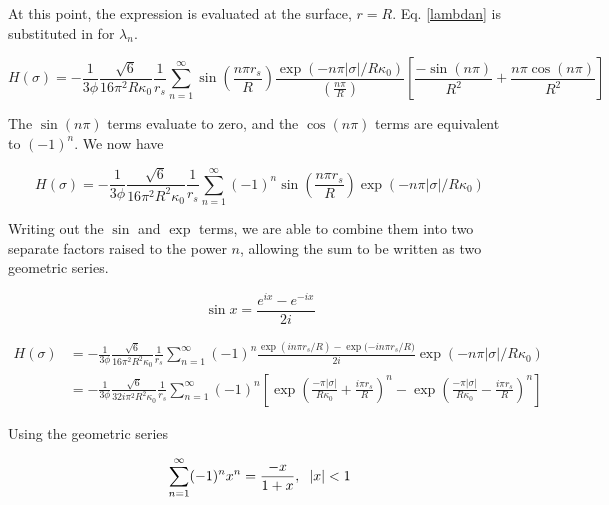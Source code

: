\documentclass[onecolumn]{aastex63}
\begin{document}
At this point, the expression is evaluated at the surface, $r=R$. Eq. \ref{lambdan} is substituted in for $\lambda_n$.

\begin{equation}
    H(\sigma) = - \frac{1}{3 \phi} \frac{\sqrt{6}}{16 \pi^2 R \kappa_0} \frac{1}{r_s} \sum_{n=1}^{\infty} \sin{\left(\frac{n\pi r_s}{R}\right)} \frac{\exp{(-n \pi |\sigma|/R\kappa_0)}}{\left(\frac{n\pi}{R}\right)} \left[ \frac{-\sin(n \pi)}{R^2} + \frac{n \pi \cos(n \pi)}{R^2}\right]
\end{equation}

The $\sin(n\pi)$ terms evaluate to zero, and the $\cos(n\pi)$ terms are equivalent to $(-1)^n$. We now have

\begin{equation}
    H(\sigma) = - \frac{1}{3 \phi} \frac{\sqrt{6}}{16 \pi^2 R^2 \kappa_0} \frac{1}{r_s} \sum_{n=1}^{\infty} (-1)^n \sin{\left(\frac{n\pi r_s}{R}\right)} \exp{(-n \pi |\sigma|/R\kappa_0)}
\end{equation}

Writing out the $\sin$ and $\exp$ terms, we are able to combine them into two separate factors raised to the power $n$, allowing the sum to be written as two geometric series.

\begin{equation}
    \sin{x} = \frac{e^{ix}-e^{-ix}}{2i}
\end{equation}

\begin{equation}
    \begin{split}
        H(\sigma) &= - \frac{1}{3 \phi} \frac{\sqrt{6}}{16 \pi^2 R^2 \kappa_0} \frac{1}{r_s} \sum_{n=1}^{\infty} (-1)^n \frac{\exp{(in\pi r_s / R)}-\exp{(-in\pi r_s/R})}{2i} \exp{(-n \pi |\sigma|/R\kappa_0)} \\
        &= - \frac{1}{3 \phi} \frac{\sqrt{6}}{32 i \pi^2 R^2 \kappa_0} \frac{1}{r_s} \sum_{n=1}^{\infty} (-1)^n \left[ \exp{\left(\frac{-\pi |\sigma|}{R\kappa_0} + \frac{i\pi r_s}{R}\right)^n}-\exp{\left(\frac{-\pi |\sigma|}{R\kappa_0} - \frac{i\pi r_s}{R}\right)^n}\right]
    \end{split}
\end{equation}

Using the geometric series

\begin{equation}
    \sum_{n=1}^{\infty}(-1)^nx^n = \frac{-x}{1+x}, \hspace{0.2cm} |x| < 1
\end{equation}
\end{document}

